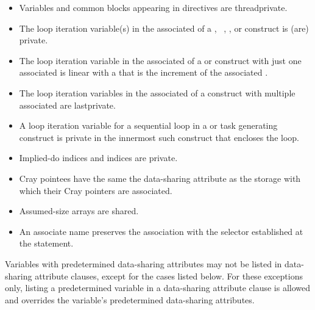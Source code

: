 \begin{fortranspecific}
\begin{itemize}
\item Variables and common blocks appearing in  directives are
threadprivate.

\item The loop iteration variable(s) in the associated  of a
  , ~,
, or  construct is (are) private.

\item The loop iteration variable in the associated  of a
   or   construct with just
one associated  is linear with a  that is the increment of
the associated .

\item The loop iteration variables in the associated  of a  construct with
multiple associated  are lastprivate.

\item A loop iteration variable for a sequential loop in a  or task generating construct is
private in the innermost such construct that encloses the loop.

\item Implied-do indices and  indices are private.

\item Cray pointees have the same the data-sharing attribute as the storage with which their Cray
pointers are associated.

\item Assumed-size arrays are shared.
\nopagebreak
\item An associate name preserves the association with the selector established at the
 statement.
\end{itemize}
\end{fortranspecific}
%
Variables with predetermined data-sharing attributes may not be listed in data-sharing
attribute clauses, except for the cases listed below. For these exceptions only, listing a
predetermined variable in a data-sharing attribute clause is allowed and overrides the
variable's predetermined data-sharing attributes.
%
